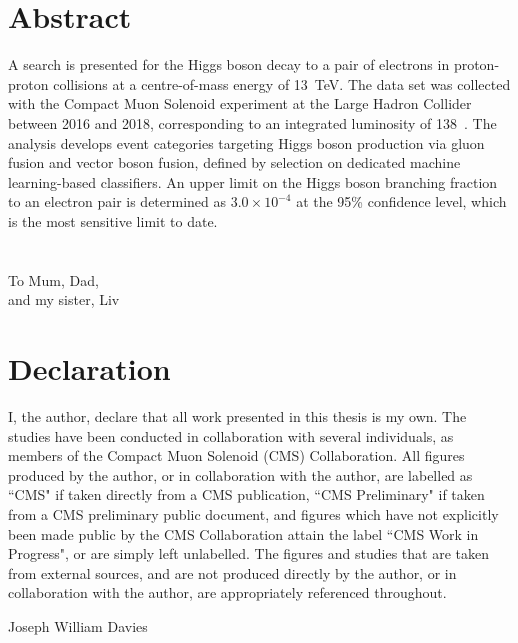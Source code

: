 \chapter*{\centering Abstract}

A search is presented for the Higgs boson decay to a pair of electrons in proton-proton collisions at a centre-of-mass energy of 13~TeV. The data set was collected with the Compact Muon Solenoid experiment at the Large Hadron Collider between 2016 and 2018, corresponding to an integrated luminosity of 138~\fbinv. The analysis develops event categories targeting Higgs boson production via gluon fusion and vector boson fusion, defined by selection on dedicated machine learning-based classifiers. An upper limit on the Higgs boson branching fraction to an electron pair is determined as $3.0\times10^{-4}$ at the 95\% confidence level, which is the most sensitive limit to date.

\chapter*{\centering }%
\begin{center}
    \thispagestyle{empty}
    To Mum, Dad,\\ and my sister, Liv
\end{center}


\chapter*{\centering Declaration}
I, the author, declare that all work presented in this thesis is my own. The studies have been conducted in collaboration with several individuals, as members of the Compact Muon Solenoid (CMS) Collaboration. All figures produced by the author, or in collaboration with the author, are labelled as ``CMS" if taken directly from a CMS publication, ``CMS Preliminary" if taken from a CMS preliminary public document, and figures which have not explicitly been made public by the CMS Collaboration attain the label ``CMS Work in Progress", or are simply left unlabelled. The figures and studies that are taken from external sources, and are not produced directly by the author, or in collaboration with the author, are appropriately referenced throughout.


\begin{flushright}
    Joseph William Davies
\end{flushright}
